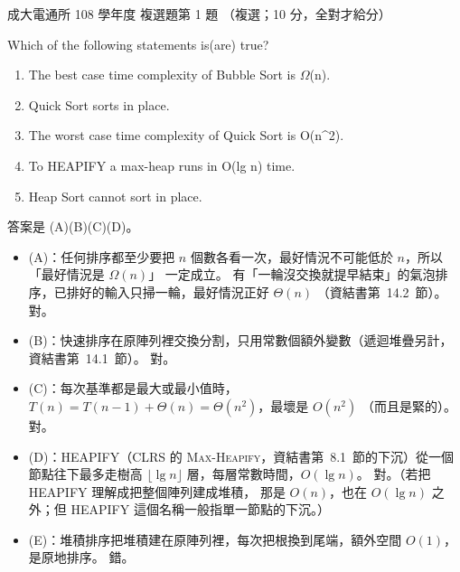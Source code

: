 \begin{pastexam}[label={px:ncku-108-comm-ds-01}]{成大電通所 108 學年度 複選題第 1 題}
（複選；10 分，全對才給分）

Which of the following statements is(are) true?
\begin{enumerate}[label=(\Alph*)]
\item The best case time complexity of Bubble Sort is $\Omega$(n).
\item Quick Sort sorts in place.
\item The worst case time complexity of Quick Sort is O(n\^{}2).
\item To HEAPIFY a max-heap runs in O(lg n) time.
\item Heap Sort cannot sort in place.
\end{enumerate}
\end{pastexam}

\begin{pastsoln}
答案是 (A)(B)(C)(D)。
\begin{itemize}
\item (A)：任何排序都至少要把 $n$ 個數各看一次，最好情況不可能低於 $n$，所以「最好情況是 $\Omega(n)$」
一定成立。 有「一輪沒交換就提早結束」的氣泡排序，已排好的輸入只掃一輪，最好情況正好 $\Theta(n)$
（資結書第~14.2~節）。 對。
\item (B)：快速排序在原陣列裡交換分割，只用常數個額外變數（遞迴堆疊另計，資結書第~14.1~節）。 對。
\item (C)：每次基準都是最大或最小值時，$T(n) = T(n-1) + \Theta(n) = \Theta(n^2)$，最壞是 $O(n^2)$
（而且是緊的）。 對。
\item (D)：HEAPIFY（CLRS 的 \textsc{Max-Heapify}，資結書第~8.1~節的下沉）從一個節點往下最多走樹高
$\lfloor \lg n \rfloor$ 層，每層常數時間，$O(\lg n)$。 對。（若把 HEAPIFY 理解成把整個陣列建成堆積，
那是 $O(n)$，也在 $O(\lg n)$ 之外；但 HEAPIFY 這個名稱一般指單一節點的下沉。）
\item (E)：堆積排序把堆積建在原陣列裡，每次把根換到尾端，額外空間 $O(1)$，是原地排序。 錯。
\end{itemize}
\end{pastsoln}
